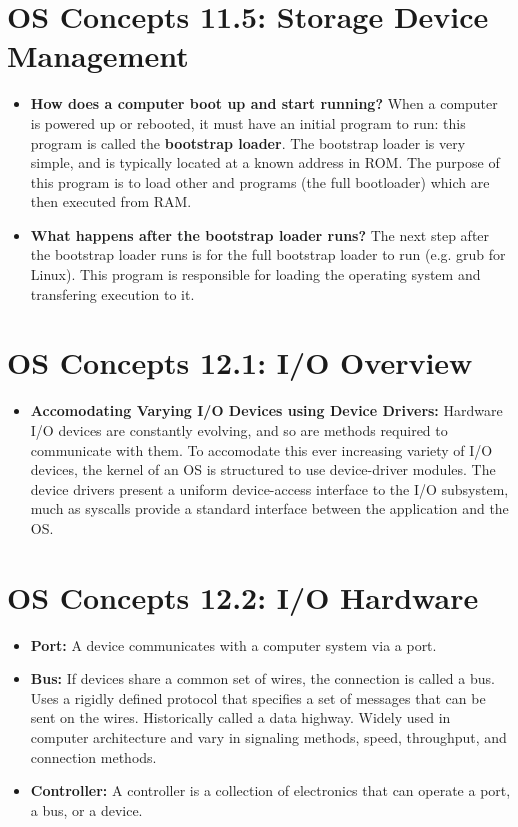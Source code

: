 \documentclass[12pt]{article}
\begin{document}
\section*{OS Concepts 11.5: Storage Device Management}

\begin{itemize}
    \item \textbf{How does a computer boot up and start running?} When a computer is powered up or rebooted, it must have an initial program to run: this program is called the \textbf{bootstrap loader}. The bootstrap loader is very simple, and is typically located at a known address in ROM. The purpose of this program is to load other and programs (the full bootloader) which are then executed from RAM.
    \item \textbf{What happens after the bootstrap loader runs?} The next step after the bootstrap loader runs is for the full bootstrap loader to run (e.g. grub for Linux). This program is responsible for loading the operating system and transfering execution to it.
\end{itemize}

\section*{OS Concepts 12.1: I/O Overview}

\begin{itemize}
    \item \textbf{Accomodating Varying I/O Devices using Device Drivers:} Hardware I/O devices are constantly evolving, and so are methods required to communicate with them. To accomodate this ever increasing variety of I/O devices, the kernel of an OS is structured to use device-driver modules. The device drivers present a uniform device-access interface to the I/O subsystem, much as syscalls provide a standard interface between the application and the OS.
\end{itemize}

\section*{OS Concepts 12.2: I/O Hardware}

\begin{itemize}
    \item \textbf{Port:} A device communicates with a computer system via a port.
    \item \textbf{Bus:} If devices share a common set of wires, the connection is called a bus. Uses a rigidly defined protocol that specifies a set of messages that can be sent on the wires. Historically called a data highway. Widely used in computer architecture and vary in signaling methods, speed, throughput, and connection methods.
    \item \textbf{Controller:}  A controller is a collection of electronics that can operate a port, a bus, or a device.
\end{itemize}
\end{document}
